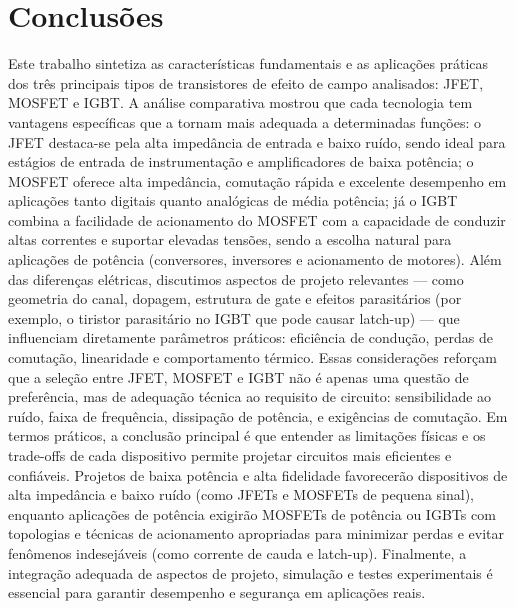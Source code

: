 \documentclass[12pt]{article}
\begin{document}
\section{Conclusões}
    Este trabalho sintetiza as características fundamentais e as aplicações práticas dos três principais tipos de transistores de efeito de campo analisados: JFET, MOSFET e IGBT. A análise comparativa mostrou que cada tecnologia tem vantagens específicas que a tornam mais adequada a determinadas funções: o JFET destaca-se pela alta impedância de entrada e baixo ruído, sendo ideal para estágios de entrada de instrumentação e amplificadores de baixa potência; o MOSFET oferece alta impedância, comutação rápida e excelente desempenho em aplicações tanto digitais quanto analógicas de média potência; já o IGBT combina a facilidade de acionamento do MOSFET com a capacidade de conduzir altas correntes e suportar elevadas tensões, sendo a escolha natural para aplicações de potência (conversores, inversores e acionamento de motores).
    Além das diferenças elétricas, discutimos aspectos de projeto relevantes — como geometria do canal, dopagem, estrutura de gate e efeitos parasitários (por exemplo, o tiristor parasitário no IGBT que pode causar latch-up) — que influenciam diretamente parâmetros práticos: eficiência de condução, perdas de comutação, linearidade e comportamento térmico. Essas considerações reforçam que a seleção entre JFET, MOSFET e IGBT não é apenas uma questão de preferência, mas de adequação técnica ao requisito de circuito: sensibilidade ao ruído, faixa de frequência, dissipação de potência, e exigências de comutação.
    Em termos práticos, a conclusão principal é que entender as limitações físicas e os trade-offs de cada dispositivo permite projetar circuitos mais eficientes e confiáveis. Projetos de baixa potência e alta fidelidade favorecerão dispositivos de alta impedância e baixo ruído (como JFETs e MOSFETs de pequena sinal), enquanto aplicações de potência exigirão MOSFETs de potência ou IGBTs com topologias e técnicas de acionamento apropriadas para minimizar perdas e evitar fenômenos indesejáveis (como corrente de cauda e latch-up). Finalmente, a integração adequada de aspectos de projeto, simulação e testes experimentais é essencial para garantir desempenho e segurança em aplicações reais.

\newpage


\end{document}
